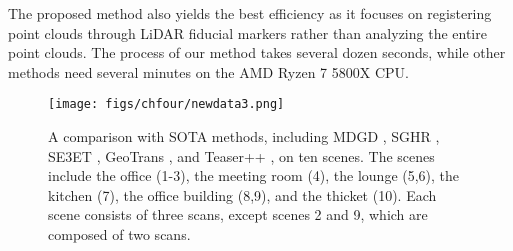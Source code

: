The proposed method also yields the best efficiency as it focuses on registering point clouds through LiDAR fiducial markers rather than analyzing the entire point clouds. The process of our method takes several dozen seconds, while other methods need several minutes on the AMD Ryzen 7 5800X CPU.
\begin{figure}[H] 
	\centering
\texttt{[image: figs/chfour/newdata3.png]}
	\caption{A comparison with SOTA methods, including MDGD \cite{mdgd}, SGHR \cite{sghr}, SE3ET \cite{se3et}, GeoTrans \cite{geotransformer}, and Teaser++ \cite{teaser}, on ten scenes. The scenes include the office (1-3), the meeting room (4), the lounge (5,6), the kitchen (7), the office building (8,9), and the thicket (10). Each scene consists of three scans, except scenes 2 and 9, which are composed of two scans.}
	\label{newbench}
\end{figure}

